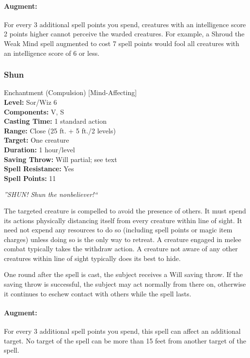 \paragraph{Augment:} For every 3 additional spell points you spend, creatures with an intelligence score 2 points higher cannot perceive the warded creatures. For example, a Shroud the Weak Mind spell augmented to cost 7 spell points would fool all creatures with an intelligence score of 6 or less.
\subsubsection{Shun}
\label{Spell:Shun}
Enchantment (Compulsion) [Mind-Affecting]
\\ \textbf{Level:} Sor/Wiz 6
\\ \textbf{Components:} V, S
\\ \textbf{Casting Time:} 1 standard action
\\ \textbf{Range:} Close (25 ft. + 5 ft./2 levels)
\\ \textbf{Target:} One creature
\\ \textbf{Duration:} 1 hour/level
\\ \textbf{Saving Throw:} Will partial; see text
\\ \textbf{Spell Resistance:} Yes
\\ \textbf{Spell Points:} 11

\emph{''SHUN! Shun the nonbeliever!``}

The targeted creature is compelled to avoid the presence of others.
It must spend its actions physically distancing itself from every creature within line of sight.
It need not expend any resources to do so (including spell points or magic item charges) unless doing so is the only way to retreat.
A creature engaged in melee combat typically takes the withdraw action. 
A creature not aware of any other creatures within line of sight typically does its best to hide.

One round after the spell is cast, the subject receives a Will saving throw. 
If the saving throw is successful, the subject may act normally from there on,
otherwise it continues to eschew contact with others while the spell lasts.

\paragraph{Augment:} For every 3 additional spell points you spend, this spell can affect an additional target.
No target of the spell can be more than 15 feet from another target of the spell.

